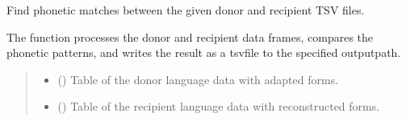 \documentclass[letterpaper,10pt,english]{sphinxmanual}
\begin{document}
\begin{fulllineitems}
\label{\detokenize{documentation:loanpy.loanfinder.phonetic_matches}}
\pysigstartsignatures
{}
\pysigstopsignatures
\sphinxAtStartPar
Find phonetic matches between the given donor and recipient TSV files.

\sphinxAtStartPar
The function processes the donor and recipient data frames,
compares the phonetic patterns,
and writes the result as a tsv\sphinxhyphen{}file to the specified output\sphinxhyphen{}path.
\begin{quote}\begin{description}
\begin{itemize}
\item {} 
\sphinxAtStartPar
{} (\sphinxstyleliteralemphasis{\sphinxupquote{ (}}\sphinxstyleliteralemphasis{\sphinxupquote{) }}\sphinxstyleliteralemphasis{\sphinxupquote{,
}}\sphinxstyleliteralemphasis{\sphinxupquote{ (}}\sphinxstyleliteralemphasis{\sphinxupquote{) }}) \textendash{} Table of the donor language data with adapted forms.

\item {} 
\sphinxAtStartPar
{} (\sphinxstyleliteralemphasis{\sphinxupquote{ (}}\sphinxstyleliteralemphasis{\sphinxupquote{) }}\sphinxstyleliteralemphasis{\sphinxupquote{,
}}\sphinxstyleliteralemphasis{\sphinxupquote{ (}}\sphinxstyleliteralemphasis{\sphinxupquote{) }}\sphinxstyleliteralemphasis{\sphinxupquote{, }}) \textendash{} Table of the recipient language data with reconstructed
forms.


\end{itemize}
\end{description}
\end{quote}
\end{fulllineitems}
\end{document}
